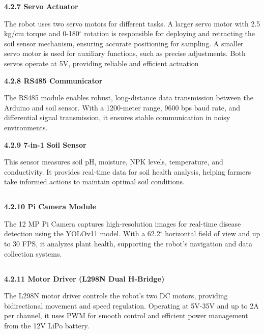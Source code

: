 \documentclass{book} %
\begin{document}
\noindent \textbf{4.2.7 Servo Actuator}

\noindent The robot uses two servo motors for different tasks. A larger servo motor with 2.5 kg/cm torque and 0-180$\mathrm{{}^\circ}$ rotation is responsible for deploying and retracting the soil sensor mechanism, ensuring accurate positioning for sampling. A smaller servo motor is used for auxiliary functions, such as precise adjustments. Both servos operate at 5V, providing reliable and efficient actuation\textbf{}

\noindent \textbf{}

\noindent \textbf{}

\noindent \textbf{4.2.8 RS485 Communicator}

\noindent The RS485 module enables robust, long-distance data transmission between the Arduino and soil sensor. With a 1200-meter range, 9600 bps baud rate, and differential signal transmission, it ensures stable communication in noisy environments.

\noindent \textbf{4.2.9 7-in-1 Soil Sensor}

\noindent This sensor measures soil pH, moisture, NPK levels, temperature, and conductivity. It provides real-time data for soil health analysis, helping farmers take informed actions to maintain optimal soil conditions.\textbf{}

\noindent 
\subsection{}

\noindent \textbf{4.2.10 Pi Camera Module}

\noindent The 12 MP Pi Camera captures high-resolution images for real-time disease detection using the YOLOv11 model. With a 62.2$\mathrm{{}^\circ}$ horizontal field of view and up to 30 FPS, it analyzes plant health, supporting the robot's navigation and data collection systems.

\noindent 
\subsection{}

\noindent \textbf{4.2.11 Motor Driver (L298N Dual H-Bridge)}

\noindent The L298N motor driver controls the robot's two DC motors, providing bidirectional movement and speed regulation. Operating at 5V-35V and up to 2A per channel, it uses PWM for smooth control and efficient power management from the 12V LiPo battery.
\end{document}
